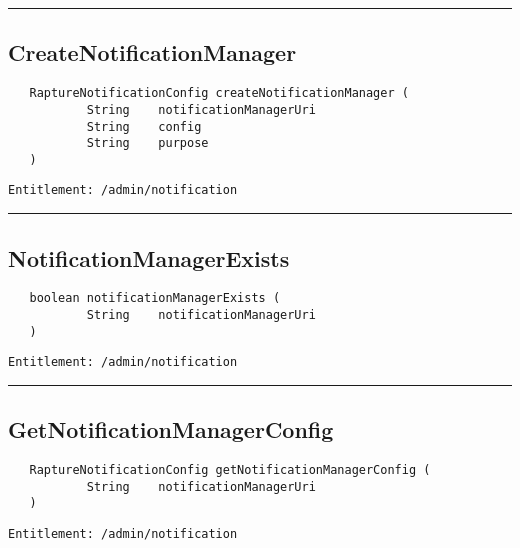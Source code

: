 \rule{12cm}{2pt}
\subsection{CreateNotificationManager}
\label{Api:CreateNotificationManager}
\begin{Verbatim}
   RaptureNotificationConfig createNotificationManager (
           String    notificationManagerUri
           String    config
           String    purpose
   )
\end{Verbatim}
\begin{Verbatim}[formatcom=\color{Maroon}]
  Entitlement: /admin/notification
\end{Verbatim}



\rule{12cm}{2pt}
\subsection{NotificationManagerExists}
\label{Api:NotificationManagerExists}
\begin{Verbatim}
   boolean notificationManagerExists (
           String    notificationManagerUri
   )
\end{Verbatim}
\begin{Verbatim}[formatcom=\color{Maroon}]
  Entitlement: /admin/notification
\end{Verbatim}



\rule{12cm}{2pt}
\subsection{GetNotificationManagerConfig}
\label{Api:GetNotificationManagerConfig}
\begin{Verbatim}
   RaptureNotificationConfig getNotificationManagerConfig (
           String    notificationManagerUri
   )
\end{Verbatim}
\begin{Verbatim}[formatcom=\color{Maroon}]
  Entitlement: /admin/notification
\end{Verbatim}



